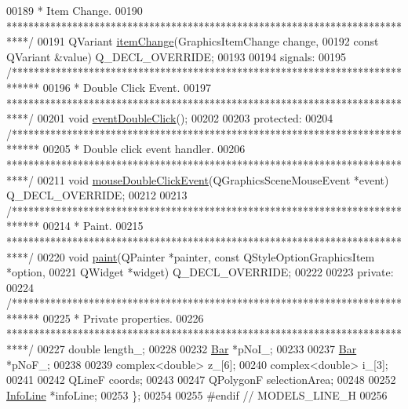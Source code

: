 \begin{DoxyCode}
00189 \textcolor{comment}{   * Item Change.}
00190 \textcolor{comment}{   ****************************************************************************/}
00191   QVariant \hyperlink{group___models_ga5fcee3f23eb50e34f730d602a3802b93}{itemChange}(GraphicsItemChange change,
00192                       const QVariant &value) Q\_DECL\_OVERRIDE;
00193 
00194 signals:
00195   \textcolor{comment}{/*****************************************************************************}
00196 \textcolor{comment}{   * Double Click Event.}
00197 \textcolor{comment}{   ****************************************************************************/}
00201   \textcolor{keywordtype}{void} \hyperlink{class_line_a2444b577ea2254994599c6f829c629a5}{eventDoubleClick}();
00202 
00203 protected:
00204   \textcolor{comment}{/*****************************************************************************}
00205 \textcolor{comment}{   * Double click event handler.}
00206 \textcolor{comment}{   ****************************************************************************/}
00211   \textcolor{keywordtype}{void} \hyperlink{group___models_ga9a1fee5b1606ab0deedd04bdab99be70}{mouseDoubleClickEvent}(QGraphicsSceneMouseEvent *event) Q\_DECL\_OVERRIDE;
00212 
00213   \textcolor{comment}{/*****************************************************************************}
00214 \textcolor{comment}{   * Paint.}
00215 \textcolor{comment}{   ****************************************************************************/}
00220   \textcolor{keywordtype}{void} \hyperlink{group___models_ga0aa64aed379d434be5942edf572b444b}{paint}(QPainter *painter, const QStyleOptionGraphicsItem *option,
00221              QWidget *widget) Q\_DECL\_OVERRIDE;
00222 
00223 private:
00224   \textcolor{comment}{/*****************************************************************************}
00225 \textcolor{comment}{   * Private properties.}
00226 \textcolor{comment}{   ****************************************************************************/}
00227   \textcolor{keywordtype}{double} length\_;
00228 
00232   \hyperlink{class_bar}{Bar} *pNoI\_;
00233 
00237   \hyperlink{class_bar}{Bar} *pNoF\_;
00238 
00239   complex<\textcolor{keywordtype}{double}> z\_[6];
00240   complex<\textcolor{keywordtype}{double}> i\_[3];
00241 
00242   QLineF coords;
00243 
00247   QPolygonF selectionArea;
00248 
00252   \hyperlink{class_info_line}{InfoLine} *infoLine;
00253 \};
00254 
00255 \textcolor{preprocessor}{#endif  // MODELS\_LINE\_H}
00256 
\end{DoxyCode}
